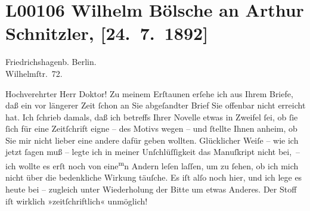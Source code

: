 

\section[Wilhelm Bölsche an Arthur Schnitzler, {[}24. 7. 1892{]}]{L00106 Wilhelm Bölsche an Arthur Schnitzler, {[}24. 7. 1892{]}}
\nopagebreak{}
\rehead{ }\normalsize\beginnumbering{}
\toendnotes[C]{\smallbreak\pagebreak[2]}
\toendnotes[C]{\smallbreak}
\pstart
           \raggedleft{}{\pb}Friedrichshagenb. Berlin.{\\}Wilhelmſtr. 72.\pend
           
\pstart\center{}Hochverehrter Herr Doktor!\pend\vspace{0.5em}
\pstart
           Zu meinem Erſtaunen erſehe ich aus Ihrem Briefe, daß ein vor längerer Zeit ſchon an
               Sie abgeſandter Brief Sie offenbar nicht erreicht hat. Ich ſchrieb damals, daß ich
               betreffs Ihrer Novelle etwas
                  \introOben{}in\introOben{} Zweifel ſei, ob ſie ſich für eine Zeitſchrift eigne –
               des Motivs wegen – und ſtellte Ihnen anheim, ob Sie mir nicht lieber eine andere
               dafür geben wollten. Glücklicher Weiſe – wie ich jetzt ſagen muß – legte ich in {\pb}meiner Unſchlüſſigkeit das Manuſkript nicht bei, – ich
               wollte es erſt noch von eine\substVorne{}\textsuperscript{m}\substDazwischen{}n\substHinten{} Andern leſen laſſen, um  zu ſehen, ob ich
               mich nicht über die bedenkliche Wirkung täuſche. Es iſt alſo noch hier, und ich lege
               es heute bei – zugleich unter Wiederholung der Bitte um etwas Anderes. Der Stoff iſt wirklich
               »zeitſchriftlich« unmöglich!\pend
           

